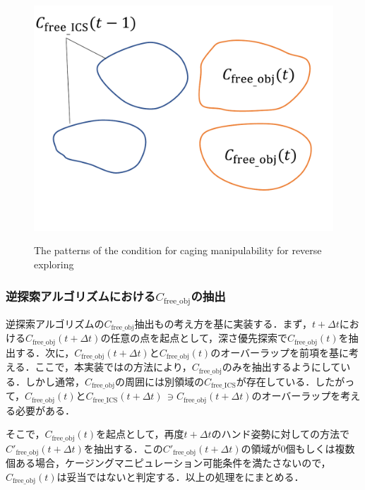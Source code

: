 \documentclass[a4paper,twoside,12pt,papersize, dvipdfmx]{iirthesis}
\begin{document}
{\begin{figure}[b]
\begin{minipage}{0.33\hsize}
\subcaption{}\label{fig::planner::cm2}
\end{minipage}\hfill
\begin{minipage}{0.33\hsize}
\includegraphics[width=\hsize]{fig/3-new-planner/rev_cagingmani_ver3.pdf}
\subcaption{}\label{fig::planner::cm3}
\end{minipage}
\caption{The patterns of the condition for caging manipulability for reverse exploring}
\label{fig::planner::cm}
\end{figure}

\subsubsection{逆探索アルゴリズムにおける$C_{\mathrm{free\_obj}}$の抽出}
逆探索アルゴリズムの$C_{\mathrm{free\_obj}}$抽出もの考え方を基に実装する．まず，$t+\Delta t$における$C_{\mathrm{free\_obj}}(t+\Delta t)$の任意の点を起点として，深さ優先探索で$C_{\mathrm{free\_obj}}(t)$を抽出する．次に，$C_{\mathrm{free\_obj}}(t+\Delta t)$と$C_{\mathrm{free\_obj}}(t)$のオーバーラップを前項を基に考える．ここで，本実装ではの方法により，$C_{\mathrm{free\_obj}}$のみを抽出するようにしている．しかし通常，$C_{\mathrm{free\_obj}}$の周囲には別領域の$C_{\mathrm{free\_ICS}}$が存在している．したがって，$C_{\mathrm{free\_obj}}(t)$と$C_{\mathrm{free\_ICS}}(t+\Delta t)\, \ni C_{\mathrm{free\_obj}}(t+\Delta t)$のオーバーラップを考える必要がある．\par
そこで，$C_{\mathrm{free\_obj}}(t)$を起点として，再度$t+\Delta t$のハンド姿勢に対しての方法で$C'_{\mathrm{free\_obj}}(t+\Delta t)$を抽出する．この$C'_{\mathrm{free\_obj}}(t+\Delta t)$の領域が0個もしくは複数個ある場合，ケージングマニピュレーション可能条件を満たさないので，$C_{\mathrm{free\_obj}}(t)$は妥当ではないと判定する．以上の処理をにまとめる．

}
\end{document}
